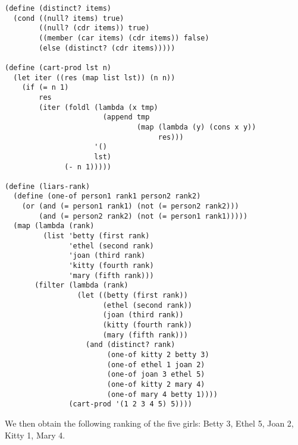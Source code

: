 \documentclass[a4paper,12pt]{article}
\begin{document}
\begin{lstlisting}
(define (distinct? items)
  (cond ((null? items) true)
        ((null? (cdr items)) true)
        ((member (car items) (cdr items)) false)
        (else (distinct? (cdr items)))))

(define (cart-prod lst n)
  (let iter ((res (map list lst)) (n n))
    (if (= n 1)
        res
        (iter (foldl (lambda (x tmp)
                       (append tmp
                               (map (lambda (y) (cons x y))
                                    res)))
                     '()
                     lst)
              (- n 1)))))

(define (liars-rank)
  (define (one-of person1 rank1 person2 rank2)
    (or (and (= person1 rank1) (not (= person2 rank2)))
        (and (= person2 rank2) (not (= person1 rank1)))))
  (map (lambda (rank)
         (list 'betty (first rank)
               'ethel (second rank)
               'joan (third rank)
               'kitty (fourth rank)
               'mary (fifth rank)))
       (filter (lambda (rank)
                 (let ((betty (first rank))
                       (ethel (second rank))
                       (joan (third rank))
                       (kitty (fourth rank))
                       (mary (fifth rank)))
                   (and (distinct? rank)
                        (one-of kitty 2 betty 3)
                        (one-of ethel 1 joan 2)
                        (one-of joan 3 ethel 5)
                        (one-of kitty 2 mary 4)
                        (one-of mary 4 betty 1))))
               (cart-prod '(1 2 3 4 5) 5))))
\end{lstlisting}

We then obtain the following ranking of the five girls:  Betty 3,
Ethel 5, Joan 2, Kitty 1, Mary 4.
\end{document}
